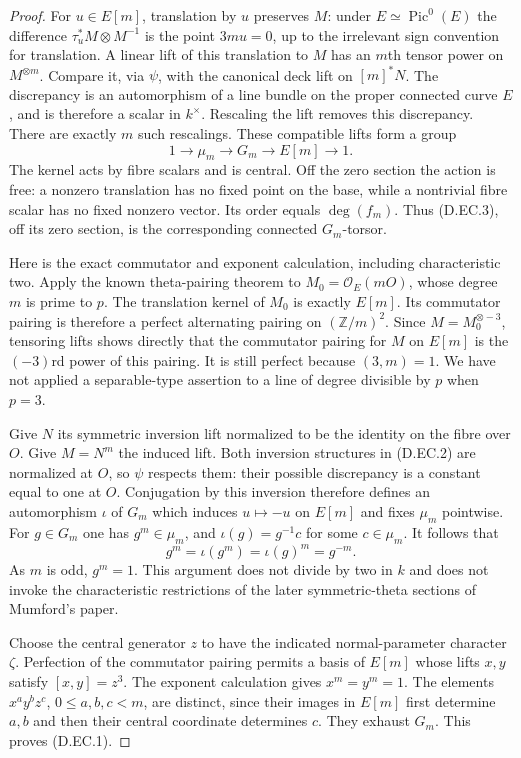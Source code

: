 \begin{proof}
For $u\in E[m]$, translation by $u$ preserves $M$:
under $E\simeq\operatorname{Pic}^0(E)$ the difference
$\tau_u^*M\otimes M^{-1}$ is the point $3mu=0$, up to the
irrelevant sign convention for translation.
A linear lift of this translation to $M$ has an $m$th tensor
power on $M^{\otimes m}$. Compare it, via $\psi$, with the
canonical deck lift on $[m]^*N$. The discrepancy is an
automorphism of a line bundle on the proper connected curve
$E$, and is therefore a scalar in $k^\times$.
Rescaling the lift removes this discrepancy. There are exactly
$m$ such rescalings. These compatible lifts form a group
\[
       1\longrightarrow\mu_m\longrightarrow G_m
         \longrightarrow E[m]\longrightarrow1.        \tag{D.EC.4}
\]
The kernel acts by fibre scalars and is central.
Off the zero section the action is free: a nonzero translation
has no fixed point on the base, while a nontrivial fibre scalar
has no fixed nonzero vector. Its order equals $\deg(f_m)$.
Thus (D.EC.3), off its zero section, is the corresponding
connected $G_m$-torsor.

Here is the exact commutator and exponent calculation, including
characteristic two. Apply the known theta-pairing theorem to
$M_0=\mathcal O_E(mO)$, whose degree $m$ is prime to $p$.
The translation kernel of $M_0$ is exactly $E[m]$.
Its commutator pairing is therefore a perfect alternating
pairing on $(\mathbb Z/m)^2$.
Since $M=M_0^{\otimes-3}$, tensoring lifts shows directly
that the commutator pairing for $M$ on $E[m]$ is the $(-3)$rd
power of this pairing. It is still perfect because $(3,m)=1$.
We have not applied a separable-type assertion to a line of
degree divisible by $p$ when $p=3$.

Give $N$ its symmetric inversion lift normalized to be the
identity on the fibre over $O$. Give $M=N^m$ the induced lift.
Both inversion structures in (D.EC.2) are normalized at $O$,
so $\psi$ respects them: their possible discrepancy is a
constant equal to one at $O$.
Conjugation by this inversion therefore defines an automorphism
$\iota$ of $G_m$ which induces $u\mapsto-u$ on $E[m]$ and
fixes $\mu_m$ pointwise. For $g\in G_m$ one has $g^m\in\mu_m$,
and $\iota(g)=g^{-1}c$ for some $c\in\mu_m$.
It follows that
\[
               g^m=\iota(g^m)=\iota(g)^m=g^{-m}.
                                                               \tag{D.EC.5}
\]
As $m$ is odd, $g^m=1$. This argument does not divide by two
in $k$ and does not invoke the characteristic restrictions
of the later symmetric-theta sections of Mumford's paper.

Choose the central generator $z$ to have the indicated
normal-parameter character $\zeta$.
Perfection of the commutator pairing permits a basis of
$E[m]$ whose lifts $x,y$ satisfy $[x,y]=z^3$.
The exponent calculation gives $x^m=y^m=1$.
The elements $x^ay^bz^c$, $0\le a,b,c<m$, are distinct,
since their images in $E[m]$ first determine $a,b$ and
then their central coordinate determines $c$.
They exhaust $G_m$. This proves (D.EC.1).


\end{proof}
